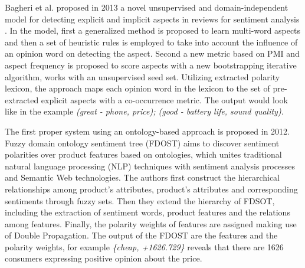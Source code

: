 Bagheri et al. proposed in 2013  a novel unsupervised and domain-independent model for detecting explicit
and implicit aspects in reviews for sentiment analysis \cite{bagheri2013care}. In the model, first a generalized method is proposed to learn multi-word aspects and then a set of heuristic rules is employed to take into account the influence of an opinion word on detecting the aspect. Second a new metric based on PMI and aspect frequency is proposed to score aspects with a new bootstrapping iterative algorithm, works with an unsupervised seed set. Utilizing extracted polarity lexicon, the approach maps each opinion word in the lexicon to the set of pre-extracted explicit aspects with a co-occurrence metric. The output would look like in the example \textit{(great - phone, price); (good - battery life, sound quality)}.

The first proper system using an ontology-based approach is proposed in 2012. Fuzzy domain ontology sentiment tree (FDOST) \cite{liu2012toward} aims to discover sentiment polarities over product features based on ontologies, which unites traditional natural language processing (NLP) techniques with sentiment analysis processes and Semantic Web technologies. The authors first construct the hierarchical relationships among product's attributes, product's attributes and corresponding sentiments through fuzzy sets. Then they extend the hierarchy of FDSOT, including the extraction of sentiment words, product features and the relations among features. Finally, the polarity weights of features are assigned making use of Double Propagation. The output of the FDOST are the features and the polarity weights, for example \textit{\{cheap, +1626.729\}} reveals that there are 1626 consumers expressing positive opinion about the price.

